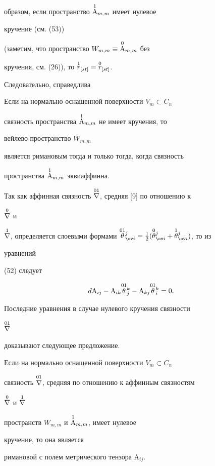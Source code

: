 образом, если пространство $\overset{1}{\mathrm A}{}_{m,m}$ имеет нулевое 


кручение (см. (53)) 


(заметим, что пространство $W_{m,m}\equiv\overset{0}{\mathrm A}{}_{m,m}$ без 


кручения, см. (26)), то $\overset{1}{r}{}_{[s t]}=\overset{0}{r}{}_{[s t]}$. 


Следовательно, справедлива 


 


\begin{thm} 


Если на нормально оснащенной поверхности $V_m\subset C_n$ 


связность пространства $\overset{1}{\mathrm A}{}_{m,m}$ не имеет кручения, то 


вейлево пространство $W_{m,m}$ 


является римановым тогда и только тогда, когда связность 


пространства $\overset{1}{\mathrm A}{}_{m,m}$ эквиаффинна. 


\end{thm} 


 


Так как аффинная связность $\overset{01}{\nabla}{}$, средняя [9] по отношению к 


$\overset{0}{\nabla}{}$ и 


$\up{1}{\nabla}$, определяется слоевыми формами $\up{01}{\theta}^j_{\ov 


i}=\frac{1}{2}(\up{0}{\theta}^j_{\ov i}+\up{1}{\theta}^j_{\ov i})$, то из 


уравнений 


(52) следует 


$$ 


d\mathrm A_{i j}-\mathrm A_{i k}\up{01}{\theta}^k_j- 


\mathrm A_{k j}\up{01}{\theta}^k_i=0. 


$$ 


Последние уравнения в случае нулевого кручения связности 


$\overset{01}{\nabla}{}$ 


доказывают следующее предложение. 


 


\begin{thm} 


Если на нормально оснащенной поверхности $V_m\subset C_n$ 


связность $\overset{01}{\nabla}{}$, средняя по отношению к аффинным связностям 


$\overset{0}{\nabla}{}$ и $\overset{1}{\nabla}{}$ 


пространств $W_{m,m}$ и $\overset{1}{\mathrm A}{}_{m,m}$, имеет нулевое 


кручение, то она является 


римановой с полем метрического тензора $\mathrm A_{i j}$. 


\end{thm} 


